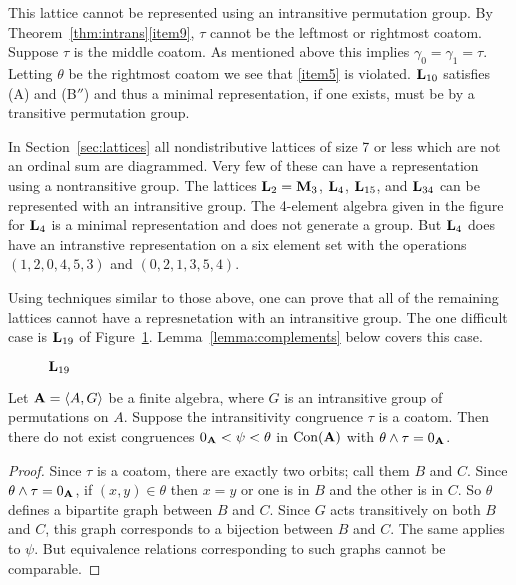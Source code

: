 This lattice cannot be represented using an intransitive permutation group. 
By Theorem~\ref{thm:intrans}\eqref{item9}, $\tau$ cannot be the leftmost or rightmost
coatom. Suppose $\tau$ is the middle coatom.  
As mentioned above this implies
$\gamma_0 = \gamma_1 = \tau$. Letting $\theta$ be the rightmost coatom we 
see that \eqref{item5} is violated. 
$\bL_{10}$ satisfies (A) and (B$''$) and thus a minimal representation, if one 
exists, must be by a transitive permutation group.

In Section~\ref{sec:lattices} 
all nondistributive lattices
of size 7 or less which are not an ordinal sum are diagrammed. 
Very few of these can have a representation using a nontransitive
group. The lattices $\bL_2 = \bM_3$, $\bL_4$, $\bL_{15}$, 
and $\bL_{34}$ can be represented with an intransitive group. 
The 4-element algebra given in the figure for $\bL_4$ is a minimal 
representation and does not generate a group. But $\bL_4$ does 
have an intranstive representation on a six element set with
the operations $(1,2,0,4,5,3)$ and $(0,2,1,3,5,4)$. 

Using techniques similar to those above, one
can prove that all of the remaining lattices cannot
have a represnetation with an intransitive group.
The one difficult case is $\bL_{19}$ of Figure~\ref{fig:L19}.
Lemma~\ref{lemma:complements} below covers this case.

\begin{figure}[htb]
\begin{center}
  \begin{tikzpicture}[scale=1]
    
  \end{tikzpicture}
\end{center}
\caption{$\bL_{19}$}\label{fig:L19}
\end{figure}

\begin{lemma}\label{lemma:complements}
Let $\bA = \<A,G\>$ be a finite algebra, where
$G$ is an intransitive group of permutations on $A$.
Suppose the intransitivity congruence $\tau$ is a coatom.
Then there do not exist congruences
$0_\bA < \psi < \theta$ in $\Con(\bA)$
with $\theta \meet \tau = 0_\bA$. 
\end{lemma}

\begin{proof}
Since $\tau$ is a coatom, there are exactly two orbits; call
them $B$ and $C$. Since $\theta \meet \tau = 0_\bA$, if
$(x,y) \in \theta$ then $x=y$ or one is in $B$ and the other
is in $C$. So $\theta$ defines a bipartite graph between
$B$ and $C$. Since $G$ acts transitively on both $B$ and $C$,
this graph corresponds to a bijection between $B$ and $C$. 
The same applies to $\psi$. But equivalence relations
corresponding to such graphs cannot be comparable.
\end{proof}

